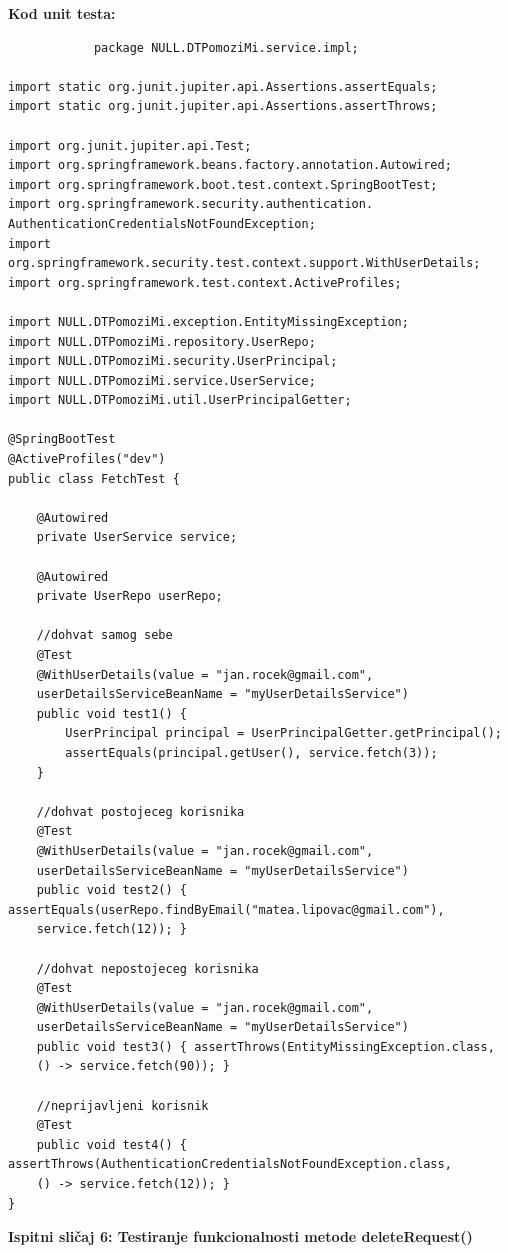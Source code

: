             \noindent \textbf{Kod unit testa: }
            \begin{verbatim}
            package NULL.DTPomoziMi.service.impl;

import static org.junit.jupiter.api.Assertions.assertEquals;
import static org.junit.jupiter.api.Assertions.assertThrows;

import org.junit.jupiter.api.Test;
import org.springframework.beans.factory.annotation.Autowired;
import org.springframework.boot.test.context.SpringBootTest;
import org.springframework.security.authentication.
AuthenticationCredentialsNotFoundException;
import org.springframework.security.test.context.support.WithUserDetails;
import org.springframework.test.context.ActiveProfiles;

import NULL.DTPomoziMi.exception.EntityMissingException;
import NULL.DTPomoziMi.repository.UserRepo;
import NULL.DTPomoziMi.security.UserPrincipal;
import NULL.DTPomoziMi.service.UserService;
import NULL.DTPomoziMi.util.UserPrincipalGetter;

@SpringBootTest
@ActiveProfiles("dev")
public class FetchTest {

	@Autowired
	private UserService service;

	@Autowired
	private UserRepo userRepo;

	//dohvat samog sebe
	@Test
	@WithUserDetails(value = "jan.rocek@gmail.com",
	userDetailsServiceBeanName = "myUserDetailsService")
	public void test1() {
		UserPrincipal principal = UserPrincipalGetter.getPrincipal();
		assertEquals(principal.getUser(), service.fetch(3));
	}

	//dohvat postojeceg korisnika
	@Test
	@WithUserDetails(value = "jan.rocek@gmail.com",
	userDetailsServiceBeanName = "myUserDetailsService")
	public void test2() { assertEquals(userRepo.findByEmail("matea.lipovac@gmail.com"), 
	service.fetch(12)); }

	//dohvat nepostojeceg korisnika
	@Test
	@WithUserDetails(value = "jan.rocek@gmail.com",
	userDetailsServiceBeanName = "myUserDetailsService")
	public void test3() { assertThrows(EntityMissingException.class, 
	() -> service.fetch(90)); }

	//neprijavljeni korisnik
	@Test
	public void test4() { assertThrows(AuthenticationCredentialsNotFoundException.class,
	() -> service.fetch(12)); }
}
            \end{verbatim}
            
            \medskip
			
			\noindent \textbf{Ispitni sličaj 6: Testiranje funkcionalnosti metode deleteRequest()}\\
			
